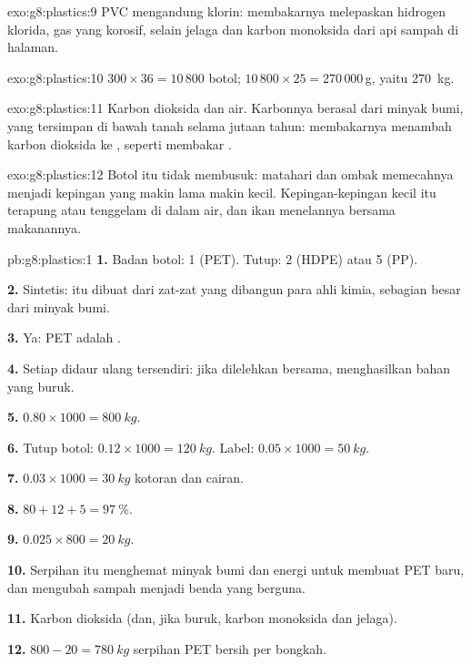 \begin{solution}{exo:g8:plastics:9}
PVC mengandung klorin: membakarnya melepaskan hidrogen klorida, gas
yang korosif, selain jelaga dan karbon monoksida dari  api  sampah di halaman.
\end{solution}

\begin{solution}{exo:g8:plastics:10}
$300 \times 36 = 10\,800$ botol; $10\,800 \times 25 = 270\,000$\,g, yaitu
\qty{270}{kg}.
\end{solution}

\begin{solution}{exo:g8:plastics:11}
Karbon dioksida dan air. Karbonnya berasal dari minyak bumi, yang
tersimpan di bawah tanah selama jutaan tahun: membakarnya menambah
karbon dioksida ke , seperti membakar .
\end{solution}

\begin{solution}{exo:g8:plastics:12}
Botol itu tidak membusuk: matahari dan ombak memecahnya menjadi
kepingan yang makin lama makin kecil. Kepingan-kepingan kecil itu
terapung atau tenggelam di dalam air, dan ikan menelannya bersama
makanannya.
\end{solution}

\begin{solution}{pb:g8:plastics:1}
\textbf{1.} Badan botol: 1 (PET). Tutup: 2 (HDPE) atau 5 (PP).

\textbf{2.} Sintetis:  itu dibuat dari zat-zat yang dibangun para
ahli kimia, sebagian besar dari minyak bumi.

\textbf{3.} Ya: PET adalah .

\textbf{4.} Setiap  didaur ulang tersendiri: jika dilelehkan
bersama,   menghasilkan bahan yang buruk.

\textbf{5.} $0.80 \times 1000 = \qty{800}{kg}$.

\textbf{6.} Tutup botol: $0.12 \times 1000 = \qty{120}{kg}$. Label: $0.05
\times 1000 = \qty{50}{kg}$.

\textbf{7.} $0.03 \times 1000 = \qty{30}{kg}$ kotoran dan cairan.

\textbf{8.} $80 + 12 + 5 = \qty{97}{\percent}$.

\textbf{9.} $0.025 \times 800 = \qty{20}{kg}$.

\textbf{10.} Serpihan itu menghemat minyak bumi dan energi untuk membuat
PET baru, dan mengubah sampah menjadi benda yang berguna.

\textbf{11.} Karbon dioksida (dan, jika  buruk, karbon
monoksida dan jelaga).

\textbf{12.} $800 - 20 = \qty{780}{kg}$ serpihan PET bersih per bongkah.
\end{solution}

